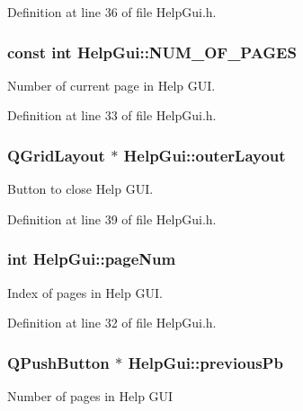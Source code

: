 Definition at line 36 of file Help\-Gui.\-h.

\hypertarget{class_help_gui_a00d2ca54630e51b77a14b61a59fb0994}{
\subsubsection[{N\-U\-M\-\_\-\-O\-F\-\_\-\-P\-A\-G\-E\-S}]{\setlength{\rightskip}{0pt plus 5cm}const int Help\-Gui\-::\-N\-U\-M\-\_\-\-O\-F\-\_\-\-P\-A\-G\-E\-S\hspace{0.3cm}{\ttfamily [private]}}}\label{class_help_gui_a00d2ca54630e51b77a14b61a59fb0994}
Number of current page in Help G\-U\-I. 

Definition at line 33 of file Help\-Gui.\-h.

\hypertarget{class_help_gui_ae1d87eba11c15aae63f5970f847fb71f}{
\subsubsection[{outer\-Layout}]{\setlength{\rightskip}{0pt plus 5cm}Q\-Grid\-Layout $\ast$ Help\-Gui\-::outer\-Layout\hspace{0.3cm}{\ttfamily [private]}}}\label{class_help_gui_ae1d87eba11c15aae63f5970f847fb71f}
Button to close Help G\-U\-I. 

Definition at line 39 of file Help\-Gui.\-h.

\hypertarget{class_help_gui_adf3a3c855433b0f1a91539782a22cc23}{
\subsubsection[{page\-Num}]{\setlength{\rightskip}{0pt plus 5cm}int Help\-Gui\-::page\-Num\hspace{0.3cm}{\ttfamily [private]}}}\label{class_help_gui_adf3a3c855433b0f1a91539782a22cc23}
Index of pages in Help G\-U\-I. 

Definition at line 32 of file Help\-Gui.\-h.

\hypertarget{class_help_gui_ae690b86677b85526a81c72aaf4d41c08}{
\subsubsection[{previous\-Pb}]{\setlength{\rightskip}{0pt plus 5cm}Q\-Push\-Button $\ast$ Help\-Gui\-::previous\-Pb\hspace{0.3cm}{\ttfamily [private]}}}\label{class_help_gui_ae690b86677b85526a81c72aaf4d41c08}
Number of pages in Help G\-U\-I 

